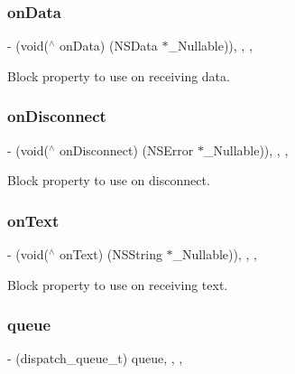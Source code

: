 \subsubsection{\texorpdfstring{on\+Data}{onData}}
{\footnotesize\ttfamily -\/ (void($^\wedge$ on\+Data) (N\+S\+Data $\ast$\+\_\+\+Nullable))\hspace{0.3cm}{\ttfamily [read]}, {\ttfamily [write]}, {\ttfamily [nonatomic]}, {\ttfamily [strong]}}

Block property to use on receiving data. \hypertarget{interface_s_t_c_web_socket_af4387124567e05ec49d18a65c9079102}{}\label{interface_s_t_c_web_socket_af4387124567e05ec49d18a65c9079102} 
\subsubsection{\texorpdfstring{on\+Disconnect}{onDisconnect}}
{\footnotesize\ttfamily -\/ (void($^\wedge$ on\+Disconnect) (N\+S\+Error $\ast$\+\_\+\+Nullable))\hspace{0.3cm}{\ttfamily [read]}, {\ttfamily [write]}, {\ttfamily [nonatomic]}, {\ttfamily [strong]}}

Block property to use on disconnect. \hypertarget{interface_s_t_c_web_socket_afb945c824c6eba5a7e7bbc111366d076}{}\label{interface_s_t_c_web_socket_afb945c824c6eba5a7e7bbc111366d076} 
\subsubsection{\texorpdfstring{on\+Text}{onText}}
{\footnotesize\ttfamily -\/ (void($^\wedge$ on\+Text) (N\+S\+String $\ast$\+\_\+\+Nullable))\hspace{0.3cm}{\ttfamily [read]}, {\ttfamily [write]}, {\ttfamily [nonatomic]}, {\ttfamily [strong]}}

Block property to use on receiving text. \hypertarget{interface_s_t_c_web_socket_a66f1cc34b3be37883c97541270257bf2}{}\label{interface_s_t_c_web_socket_a66f1cc34b3be37883c97541270257bf2} 
\subsubsection{\texorpdfstring{queue}{queue}}
{\footnotesize\ttfamily -\/ (dispatch\+\_\+queue\+\_\+t) queue\hspace{0.3cm}{\ttfamily [read]}, {\ttfamily [write]}, {\ttfamily [nonatomic]}, {\ttfamily [strong]}}

